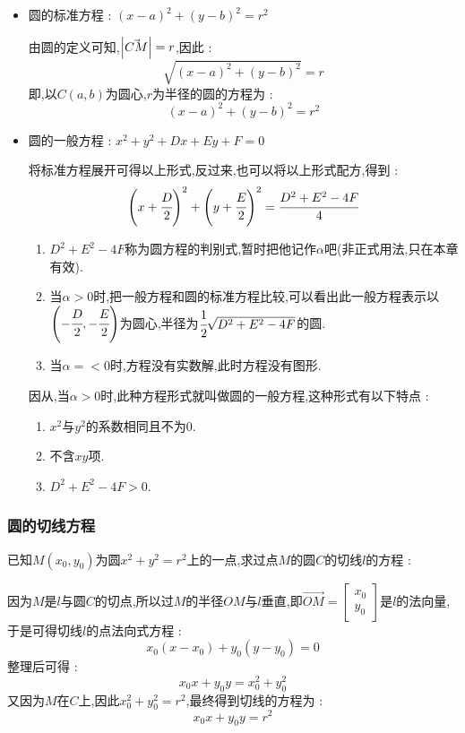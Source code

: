 {{{      \begin{itemize}
        \item {
              圆的标准方程 : $(x - a)^2 + (y - b)^2 = r^2$

              由圆的定义可知,$\left\lvert \vec{CM} \right\vert = r$,因此 : $$
                \sqrt{(x - a)^2 + (y - b)^2} = r
              $$
              即,以$C(a,b)$为圆心,$r$为半径的圆的方程为 : $$
                (x - a)^2 + (y - b)^2 = r^2
              $$
              }
        \item {
              圆的一般方程 : $x^2 + y^2 + Dx + Ey + F = 0$

              将标准方程展开可得以上形式,反过来,也可以将以上形式配方,得到 : $$
                \left(x + \cfrac{D}{2}\right)^2 + \left(y + \cfrac{E}{2}\right)^2 = \cfrac{D^2 + E^2 - 4F}{4}
              $$

              \begin{enumerate}
                \item $D^2 + E^2 - 4F$称为圆方程的判别式,暂时把他记作$\alpha$吧(非正式用法,只在本章有效).
                \item 当$\alpha > 0$时,把一般方程和圆的标准方程比较,可以看出此一般方程表示以$\left(-\cfrac{D}{2},-\cfrac{E}{2}\right)$为圆心,半径为$\cfrac{1}{2}\sqrt{D^2 + E^2 - 4F}$的圆.
                \item 当$\alpha = < 0$时,方程没有实数解,此时方程没有图形.
              \end{enumerate}

              因从,当$\alpha > 0$时,此种方程形式就叫做圆的一般方程,这种形式有以下特点 :
              \begin{enumerate}
                \item $x^2$与$y^2$的系数相同且不为0.
                \item 不含$xy$项.
                \item $D^2 + E^2 - 4F > 0$.
              \end{enumerate}
              }
      \end{itemize}
    }%

    \subsubsection{圆的切线方程}{
      已知$M(x_0,y_0)$为圆$x^2 + y^2 = r^2$上的一点,求过点$M$的圆$C$的切线$l$的方程 :

      因为$M$是$l$与圆$C$的切点,所以过$M$的半径$OM$与$l$垂直,即$\vec{OM}=\begin{bmatrix}
          x_0 \\ y_0
        \end{bmatrix}$是$l$的法向量,于是可得切线$l$的点法向式方程 : $$
        x_0(x - x_0) + y_0(y - y_0) = 0
      $$
      整理后可得 : $$
        x_0x + y_0y = x_0^2 + y_0^2
      $$
      又因为$M$在$C$上,因此$x_0^2 + y_0^2 = r^2$,最终得到切线的方程为 : $$
        x_0x + y_0y = r^2
      $$
    }%

}}
